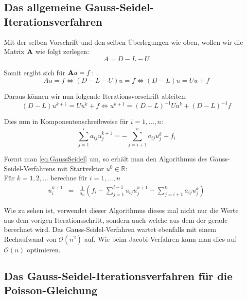 \subsection{Das allgemeine Gauss-Seidel-Iterationsverfahren}\label{ss.Allgemeines Gauss-Seidel-Verfahren}

Mit der selben Vorschrift und den selben Überlegungen wie oben, wollen wir die Matrix ${\textbf{A}}$ wie folgt zerlegen:
\begin{equation}
A = D - L - U
\end{equation}

Somit ergibt sich für ${\textbf{A}}u = f$:
\begin{equation}
Au = f \Leftrightarrow (D-L-U)u = f \Leftrightarrow (D-L)u = Uu + f
\end{equation}

Daraus können wir nun folgende Iterationsvorschrift ableiten:
\begin{equation}
(D-L)u^{k+1} = Uu^{k} + f \Leftrightarrow u^{k+1} = (D-L)^{-1}Uu^{k} + (D-L)^{-1}f
\end{equation}

Dies nun in Komponentenschreibweise für $i=1,...,n$:
\begin{equation}
\sum\limits_{j=1}^{i} a_{ij}u_{j}^{k+1} = -\sum\limits_{j=i+1}^{n} a_{ij}u_{j}^{k} + f_{i}\label{eq.GaussSeidel}
\end{equation}

Formt man \autoref{eq.GaussSeidel} um, so erhält man den Algorithmus des Gauss-Seidel-Verfahrens mit Startvektor $u^{0} \in \mathbb{R}$: \\

Für $k = 1,2,...$ berechne für $i = 1,...,n$
\begin{eqnarray}
u_{i}^{k+1} &=& \frac {1} {a_{ii}} (f_{i} - \sum\limits_{j=1}^{i-1} a_{ij}u_{j}^{k+1} - \sum\limits_{j=i+1}^{n} a_{ij}u_{j}^{k})
\end{eqnarray}

Wie zu sehen ist, verwendet dieser Algorithmus dieses mal nicht nur die Werte aus dem vorigen Iterationsschritt, sondern auch welche aus dem der gerade berechnet wird. Das Gauss-Seidel-Verfahren wartet ebenfalls mit einem Rechaufwand von $\mathcal{O}(n^{2})$ auf. Wie beim Jacobi-Verfahren kann man dies auf $\mathcal{O}(n)$ optimieren.

\subsection{Das Gauss-Seidel-Iterationsverfahren für die Poisson-Gleichung}\label{ss.Gauss-Seidel-Verfahren der Poisson Gleichung}

